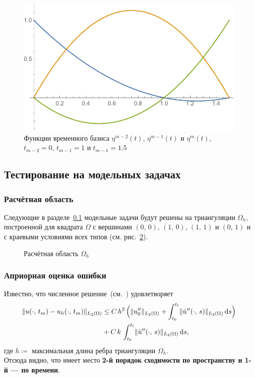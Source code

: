 \begin{figure}[!h]
	\centering
	\includegraphics[width=0.8\linewidth]{img/timeBasis.pdf}
	\caption{Функции временного базиса $\eta^{m-2}(t)$, $\eta^{m-1}(t)$ и $\eta^{m}(t)$, $t_{m-2} = 0$, $t_{m-1} = 1$ и $t_{m-1} = 1.5$}
	\label{fig:timeBasis}
\end{figure}

\subsection{Тестирование на модельных задачах}
\label{hyperbolicTests}

\subsubsection{Расчётная область}

Следующие в разделе~\ref{hyperbolicTests} модельные задачи будут решены на триангуляции $\Omega_h$, построенной для квадрата $\Omega$ с вершинами $(0, \, 0)$, $(1, \, 0)$, $(1, \, 1)$ и $(0, \, 1)$ и с краевыми условиями всех типов (см. рис.~\ref{fig:modelSquare}).

\begin{figure}[!h]
	\centering
	\resizebox{0.5\textwidth}{!}{}
	\caption{Расчётная область $\Omega_h$}
	\label{fig:modelSquare}
\end{figure}

\subsubsection{Априорная оценка ошибки}

Известно, что численное решение~(см.~\cite[с.~124]{umea}) удовлетворяет
\begin{align}
\label{estimate}
	\normL{u(\cdot, \, t_m) - u_h(\cdot, \, t_m)} & \le
	C \, h^2 \, \Big( 
		\normL{u''_0} + \int_{t_0}^{t_l} \normL{\dot{u}''(\cdot, \, s)} \diff{s}
	\Big) \nonumber \\
	& + C \, k \, \int_{t_0}^{t_l} \normL{\ddot{u}''(\cdot, \, s)} \diff{s},
\end{align}
где $h \coloneqq$ максимальная длина ребра триангуляции $\Omega_h$. \\
Отсюда видно, что имеет место \textbf{2-й порядок сходимости по пространству и 1-й --- по времени}.

